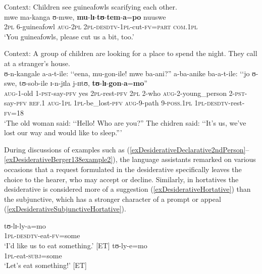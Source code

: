 \begin{exe}
\ex \label{exDesiderativeBerger138example1}
Context: Children see guineafowls scarifying each other.\\
\gll mwe ma-kanga ʊ-mwe, \textbf{mu}-\textbf{lɪ}-\textbf{tʊ}-\textbf{tem}-\textbf{a}=\textbf{po} nuuswe\\
\textsc{2pl} 6-guineafowl \textsc{aug}-\textsc{2pl} \textsc{2pl}-\textsc{desdtv}-\textsc{1pl}-cut-\textsc{fv}=\textsc{part} \textsc{com.1pl}\\
\glt \lq You guineafowls, please cut us a bit, too.' \citep[116]{BergerP1933}

\ex \label{exDesiderativeBerger138example2}
Context: A group of children are looking for a place to spend the night. They call at a stranger's house.\\
\gll ʊ-n-kangale a-a-t-ile: \textup{\lq\lq}eena, mu-gon-ile! mwe ba-ani?\textup{''} a-ba-anike ba-a-t-ile: \textup{\lq\lq}jo ʊ-swe, tʊ-sob-ile ɪ-n-jɪla j-ɪɪtʊ, \textbf{tʊ}-\textbf{lɪ}-\textbf{gon}-\textbf{a}=\textbf{mo}\textup{''}\\
\textsc{aug}-1-old 1-\textsc{pst}-say-\textsc{pfv} \phantom{\lq\lq}yes \textsc{2pl}-rest-\textsc{pfv} \textsc{2pl} 2-who \textsc{aug}-2-young\_person 2-\textsc{pst}-say-\textsc{pfv} \phantom{\lq\lq}\textsc{ref.1} \textsc{aug}-\textsc{1pl} \textsc{1pl}-be\_lost-\textsc{pfv} \textsc{aug}-9-path 9-\textsc{poss.1pl} \textsc{1pl}-\textsc{desdtv}-rest-\textsc{fv}=18\\
\glt \lq The old woman said: \lq\lq Hello! Who are you?'' The chidren said: \lq\lq It's us, we've lost our way and would like to sleep.''{}' \citep[137]{BergerP1933}
\end{exe}

During discussions of examples such as (\ref{exDesiderativeDeclarative2ndPerson}--\ref{exDesiderativeBerger138example2}), the language assistants remarked on various occasions that a request formulated in the desiderative specifically leaves the choice to the hearer, who may accept or decline. Similarly, in hortatives the desiderative  is considered more of a suggestion (\ref{exDesiderativeHortative}) than the subjunctive, which has a stronger character of a prompt or appeal (\ref{exDesiderativeSubjunctiveHortative}).
\begin{exe}
\ex\begin{xlist}
\ex\label{exDesiderativeHortative} \gll tʊ-lɪ-ly-a=mo\\
\textsc{1pl}-\textsc{desdtv}-eat-\textsc{fv}=some\\
\glt `I'd like us to eat something.' [ET]
\ex \label{exDesiderativeSubjunctiveHortative}\gll tʊ-ly-e=mo\\
\textsc{1pl}-eat-\textsc{subj}=some\\
\glt `Let's eat something!' [ET]
\end{xlist}
\end{exe}

